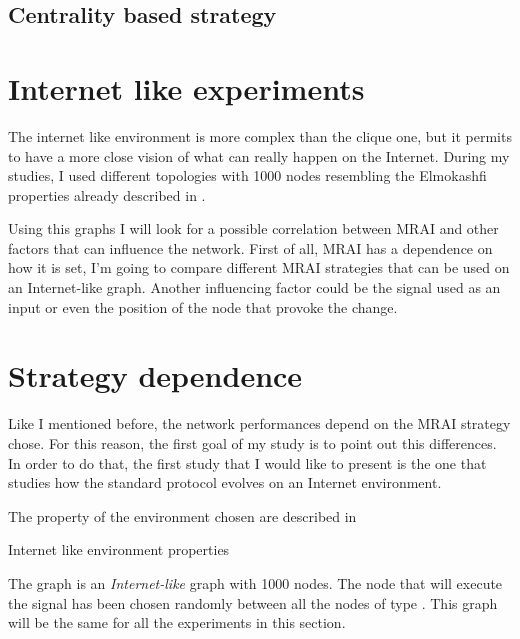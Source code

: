 \subsection{Centrality based strategy}
\label{subsec:bgp_mrai_dpc}

\section{Internet like experiments}
\label{sec:bgp_mrai_internet_like}

The internet like environment is more complex than the clique one, but it permits
to have a more close vision of what can really happen on the Internet.
During my studies, I used different topologies with \num{1000} nodes resembling
the Elmokashfi properties \cite{elmokashfi2010scalability} already
described in .

Using this graphs I will look for a possible correlation between \ac{MRAI} and other
factors that can influence the network.
First of all, \ac{MRAI} has a dependence on how it is set, I'm going to compare
different \ac{MRAI} strategies that can be used on an Internet-like graph.
Another influencing factor could be the signal used as an input or even the position
of the node that provoke the change.

\section{Strategy dependence}
\label{sec:bgp_mrai_strategy_dependance}

Like I mentioned before, the network performances depend on the \ac{MRAI} strategy
chose.
For this reason, the first goal of my study is to point out this differences.
In order to do that, the first study that I would like to present is the one
that studies how the standard protocol evolves on an Internet environment.

The property of the environment chosen are described in 

\begin{table}[h]
	
	\caption{Internet like environment properties}
	\label{tbl:internet_like_properties}
\end{table}

The graph is an \textit{Internet-like} graph with \num{1000} nodes.
The node that will execute the signal has been chosen randomly between
all the nodes of type .
This graph will be the same for all the experiments in this section.

